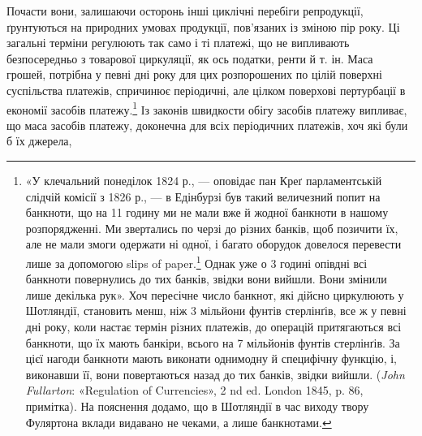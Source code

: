 Почасти вони, залишаючи осторонь інші циклічні перебіги
репродукції, ґрунтуються на природних умовах продукції,
пов’язаних із зміною пір року. Ці загальні терміни регулюють
так само і ті платежі, що не випливають безпосередньо з товарової
циркуляції, як ось податки, ренти й т. ін. Маса грошей, потрібна
у певні дні року для цих розпорошених по цілій поверхні суспільства
платежів, спричинює періодичні, але цілком поверхові пертурбації
в економії засобів платежу.\footnote{
«У клечальний понеділок 1824 р., — оповідає пан Креґ парламентській
слідчій комісії з 1826 р., — в Едінбурзі був такий величезний попит
на банкноти, що на 11 годину ми не мали вже й жодної банкноти в нашому
розпорядженні. Ми звертались по черзі до різних банків, щоб позичити
їх, але не мали змоги одержати ні одної, і багато оборудок довелося перевести
лише за допомогою slips of paper.\footnote*{
— шматків паперу. \emph{Ред.}
} Однак уже о 3 годині опівдні
всі банкноти повернулись до тих банків, звідки вони вийшли. Вони змінили
лише декілька рук». Хоч пересічне число банкнот, які дійсно циркулюють
у Шотляндії, становить менш, ніж 3 мільйони фунтів стерлінґів,
все ж у певні дні року, коли настає термін різних платежів, до операцій
притягаються всі банкноти, що їх мають банкіри, всього на 7 мільйонів
фунтів стерлінґів. За цієї нагоди банкноти мають виконати однимодну
й специфічну функцію, і, виконавши її, вони повертаються назад
до тих банків, звідки вийшли. (\emph{John Fullarton}: «Regulation of Currencies»,
2 nd ed. London 1845, p. 86, примітка). На пояснення додамо, що в Шотляндії
в час виходу твору Фуляртона вклади видавано не чеками, а лише
банкнотами.
} Із законів швидкости
обігу засобів платежу випливає, що маса засобів платежу, доконечна
для всіх періодичних платежів, хоч які були б їх джерела,
